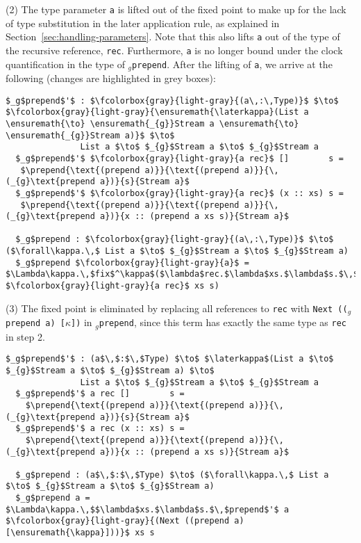 (2) The type parameter \texttt{a} is lifted out of the fixed point to make up
for the lack of type substitution in the later application rule, as explained in
Section~\ref{sec:handling-parameters}. Note that this also lifts \texttt{a} out
of the type of the recursive reference, \texttt{rec}. Furthermore, \texttt{a} is
no longer bound under the clock quantification in the type of
\texttt{$_g$prepend}. After the lifting of \texttt{a}, we arrive at the following
(changes are highlighted in grey boxes):
\begin{lstlisting}[mathescape, title=\ttBlock]
  $_g$prepend$'$ : $\fcolorbox{gray}{light-gray}{(a\,:\,Type)}$ $\to$ $\fcolorbox{gray}{light-gray}{\ensuremath{\laterkappa}(List a \ensuremath{\to} \ensuremath{_{g}}Stream a \ensuremath{\to} \ensuremath{_{g}}Stream a)}$ $\to$ 
               List a $\to$ $_{g}$Stream a $\to$ $_{g}$Stream a
  $_g$prepend$'$ $\fcolorbox{gray}{light-gray}{a rec}$ []        s =
   $\prepend{\text{(prepend a)}}{\text{(prepend a)}}{\,(_{g}\text{prepend a})}{s}{Stream a}$
  $_g$prepend$'$ $\fcolorbox{gray}{light-gray}{a rec}$ (x :: xs) s =
   $\prepend{\text{(prepend a)}}{\text{(prepend a)}}{\,(_{g}\text{prepend a})}{x :: (prepend a xs s)}{Stream a}$

  $_g$prepend : $\fcolorbox{gray}{light-gray}{(a\,:\,Type)}$ $\to$ ($\forall\kappa.\,$ List a $\to$ $_{g}$Stream a $\to$ $_{g}$Stream a)
  $_g$prepend $\fcolorbox{gray}{light-gray}{a}$ = $\Lambda\kappa.\,$fix$^\kappa$($\lambda$rec.$\lambda$xs.$\lambda$s.$\,$prepend$'$ $\fcolorbox{gray}{light-gray}{a rec}$ xs s)
\end{lstlisting}
(3) The fixed point is eliminated by replacing all references to
\texttt{rec} with \texttt{Next~(($_g$prepend~a)~[$\kappa$])} in \texttt{$_g$prepend}, since this term has
exactly the same type as \texttt{rec} in step 2.
\begin{lstlisting}[mathescape, title=\ttBlock]
  $_g$prepend$'$ : (a$\,$:$\,$Type) $\to$ $\laterkappa$(List a $\to$ $_{g}$Stream a $\to$ $_{g}$Stream a) $\to$ 
               List a $\to$ $_{g}$Stream a $\to$ $_{g}$Stream a
  $_g$prepend$'$ a rec []        s =
    $\prepend{\text{(prepend a)}}{\text{(prepend a)}}{\,(_{g}\text{prepend a})}{s}{Stream a}$
  $_g$prepend$'$ a rec (x :: xs) s =
    $\prepend{\text{(prepend a)}}{\text{(prepend a)}}{\,(_{g}\text{prepend a})}{x :: (prepend a xs s)}{Stream a}$

  $_g$prepend : (a$\,$:$\,$Type) $\to$ ($\forall\kappa.\,$ List a $\to$ $_{g}$Stream a $\to$ $_{g}$Stream a)
  $_g$prepend a = $\Lambda\kappa.\,$$\lambda$xs.$\lambda$s.$\,$prepend$'$ a $\fcolorbox{gray}{light-gray}{(Next ((prepend a)[\ensuremath{\kappa}]))}$ xs s
\end{lstlisting}
